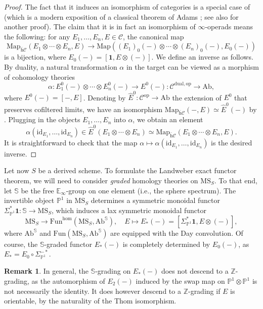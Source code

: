 \documentclass{amsart}
\numberwithin{equation}{section}
\theoremstyle{plain}
\theoremstyle{definition}
\newtheorem{remark}[equation]{Remark}
\let\scr=\mathcal
\let\bb=\mathbb
\def\Z{\bb Z}
\def\P{\bb P}
\def\1{\mathbf 1}
\def\ph{\mathord-}
\def\id{\mathrm{id}}
\def\Map{\mathrm{Map}}
\def\E{\mathbb{E}}
\def\op{\mathrm{op}}
\def\MS{\mathrm{MS}}
\def\Ab{\mathrm{A}\mathrm{b}}
\def\Fun{\mathrm{Fun}}
\def\w{\bar{\mathrm{h}}}
\def\dual{\mathrm{dual}}
\begin{document}
\begin{proof}
	The fact that it induces an isomorphism of categories is a special case of \cite[Corollary 19(2)]{AdamsRep} (which is a modern exposition of a classical theorem of Adams \cite{AdamsBrown}; see also \cite[Theorem 5.1 and Proposition 4.11]{NeemanAdams} for another proof). The claim that it is in fact an isomorphism of $\infty$-operads means the following: for any $E_1,\dotsc,E_n, E\in\scr C$, the canonical map
	\[
	\Map_{\w\scr C}(E_1\otimes\dotsb\otimes E_n,E) \to \Map((E_1)_0(\ph)\otimes\dotsb\otimes (E_n)_0(\ph),E_0(\ph))
	\]
	is a bijection, where $E_0(\ph)=[\1,E\otimes(\ph)]$.
	We define an inverse as follows. By duality, a natural transformation $\alpha$ in the target can be viewed as a morphism of cohomology theories
	\[
	\alpha\colon E_1^0(\ph)\otimes \dotsb \otimes E_n^0(\ph)\to E^0(\ph)\colon \scr C^{\dual,\op}\to \Ab,
	\]
	where $E^0(\ph)=[\ph,E]$.
	Denoting by $\widehat E^0\colon \scr C^\op\to\Ab$ the extension of $E^0$ that preserves cofiltered limits, we have an isomorphism $\Map_{\w\scr C}(\ph,E)\simeq \widehat E^0(\ph)$ by \cite[Lemma 17]{AdamsRep}. Plugging in the objects $E_1,\dotsc,E_n$ into $\alpha$, we obtain an element
	\[
	\alpha(\id_{E_1},\dotsc,\id_{E_n}) \in \widehat E^0(E_1\otimes\dotsb\otimes E_n)\simeq \Map_{\w\scr C}(E_1\otimes\dotsb\otimes E_n,E).
	\]
	It is straightforward to check that the map $\alpha\mapsto \alpha(\id_{E_1},\dotsc,\id_{E_n})$ is the desired inverse.
\end{proof}

Let now $S$ be a derived scheme. To formulate the Landweber exact functor theorem, we will need to consider \emph{graded} homology theories on $\MS_S$.
To that end, let $\bb S$ be the free $\E_\infty$-group on one element (i.e., the sphere spectrum). The invertible object $\P^1$ in $\MS_S$ determines a symmetric monoidal functor $\Sigma_{\P^1}^*\1\colon \bb S\to\MS_S$, which induces a lax symmetric monoidal functor
\[
\MS_S \to \Fun^\mathrm{hom}(\MS_S,\Ab^\bb S),\quad E\mapsto E_*(\ph)= [\Sigma_{\P^1}^*\1,E\otimes (\ph)],
\]
where $\Ab^\bb S$ and $\Fun(\MS_S,\Ab^\bb S)$ are equipped with the Day convolution. Of course, the $\bb S$-graded functor $E_*(\ph)$ is completely determined by $E_0(\ph)$, as $E_*=E_0\circ \Sigma^{-*}_{\P^1}$.

\begin{remark}\label{rmk:Z-grading}
	In general, the $\bb S$-grading on $E_*(\ph)$ does not descend to a $\Z$-grading, as the automorphism of $E_2(\ph)$ induced by the swap map on $\P^1\otimes\P^1$ is not necessarily the identity. It does however descend to a $\Z$-grading if $E$ is orientable, by the naturality of the Thom isomorphism.
\end{remark}
\end{document}
